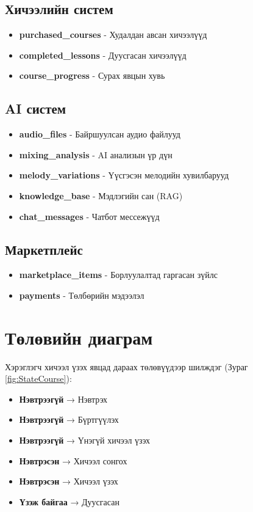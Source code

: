 \subsection{Хичээлийн систем}
\begin{itemize}
    \item \textbf{purchased\_courses} - Худалдан авсан хичээлүүд
    \item \textbf{completed\_lessons} - Дуусгасан хичээлүүд
    \item \textbf{course\_progress} - Сурах явцын хувь
\end{itemize}

\subsection{AI систем}
\begin{itemize}
    \item \textbf{audio\_files} - Байршуулсан аудио файлууд
    \item \textbf{mixing\_analysis} - AI анализын үр дүн
    \item \textbf{melody\_variations} - Үүсгэсэн мелодийн хувилбарууд
    \item \textbf{knowledge\_base} - Мэдлэгийн сан (RAG)
    \item \textbf{chat\_messages} - Чатбот мессежүүд
\end{itemize}

\subsection{Маркетплейс}
\begin{itemize}
    \item \textbf{marketplace\_items} - Борлуулалтад гаргасан зүйлс
    \item \textbf{payments} - Төлбөрийн мэдээлэл
\end{itemize}

\section{Төлөвийн диаграм}

Хэрэглэгч хичээл үзэх явцад дараах төлөвүүдээр шилждэг (Зураг \ref{fig:StateCourse}):
\begin{itemize}
    \item \textbf{Нэвтрээгүй} → Нэвтрэх
    \item \textbf{Нэвтрээгүй} → Бүртгүүлэх
    \item \textbf{Нэвтрээгүй} → Үнэгүй хичээл үзэх
    \item \textbf{Нэвтрэсэн} → Хичээл сонгох
    \item \textbf{Нэвтрэсэн} → Хичээл үзэх
    \item \textbf{Үзэж байгаа} → Дуусгасан
\end{itemize}

